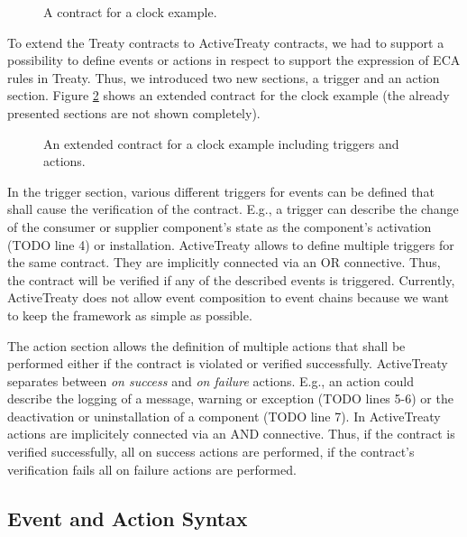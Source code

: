 \documentclass{llncs}
\begin{document}
\begin{figure}
  \lstset{ language=XML }
  
  \caption{A contract for a clock example.}
  \label{lst:clock01}
\end{figure}

To extend the Treaty contracts to ActiveTreaty contracts, we had to support a possibility to define events or actions in respect to support the expression of ECA rules in Treaty. Thus, we introduced two new sections, a trigger and an action section. Figure \ref{lst:clock02} shows an extended contract for the clock example (the already presented sections are not shown completely).

\begin{figure}[t]
  \lstset{ language=XML }
  
  \caption{An extended contract for a clock example including triggers and actions.}
  \label{lst:clock02}
\end{figure}

In the trigger section, various different triggers for events can be defined that shall cause the verification of the contract. E.g., a trigger can describe the change of the consumer or supplier component's state as the component's activation (TODO line 4) or installation. ActiveTreaty allows to define multiple triggers for the same contract. They are implicitly connected via an OR connective. Thus, the contract will be verified if any of the described events is triggered. Currently, ActiveTreaty does not allow event composition to event chains because we want to keep the framework as simple as possible.

The action section allows the definition of multiple actions that shall be performed either if the contract is violated or verified successfully. ActiveTreaty separates between \textit{on success} and \textit{on failure} actions. E.g., an action could describe the logging of a message, warning or exception (TODO lines 5-6) or the deactivation or uninstallation of a component (TODO line 7). In ActiveTreaty actions are implicitely connected via an AND connective. Thus, if the contract is verified successfully, all on success actions are performed, if the contract's verification fails all on failure actions are performed.
	


\subsection{Event and Action Syntax} 
\end{document}

